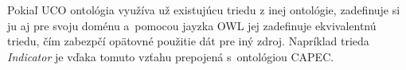 \documentclass[12pt, a4paper, oneside]{book}
\begin{document}
Pokiaľ UCO ontológia využíva už existujúcu triedu z inej ontológie, zadefinuje si ju aj pre svoju doménu a~pomocou jayzka OWL jej zadefinuje ekvivalentnú triedu, čím zabezpčí opätovné použitie dát pre iný zdroj. Napríklad trieda \textit{Indicator} je vďaka tomuto vzťahu prepojená s~ontológiou CAPEC.

\end{document}

